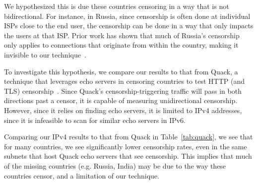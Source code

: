 We hypothesized this is due these countries censoring in a way that is not
bidirectional. For instance, in Russia, since censorship is often done at
individual ISPs close to the end user, the censorship can be done in a way that
only impacts the users at that ISP. Prior work has shown that much of Russia's
censorship only applies to connections that originate from within the country,
making it invisible to our technique~\cite{xue2021throttling}.

To investigate this hypothesis, we compare our results to that from Quack, a
technique that leverages echo servers in censoring countries to test HTTP (and
TLS) censorship~\cite{vandersloot2018quack}. Since Quack's censorship-triggering traffic will pass in both
directions past a censor, it is capable of measuring unidirectional censorship.
However, since it relies on finding echo servers, it is limited to IPv4
addresses, since it is infeasible to scan for similar echo servers in IPv6.

Comparing our IPv4 results to that from Quack in Table~\ref{tab:quack}, we see that for many countries,
we see significantly lower censorship rates, even in the same subnets that host
Quack echo servers that see censorship. This implies that much of the missing
countries (e.g. Russia, India) may be due to the way these countries censor, and
a limitation of our technique.

